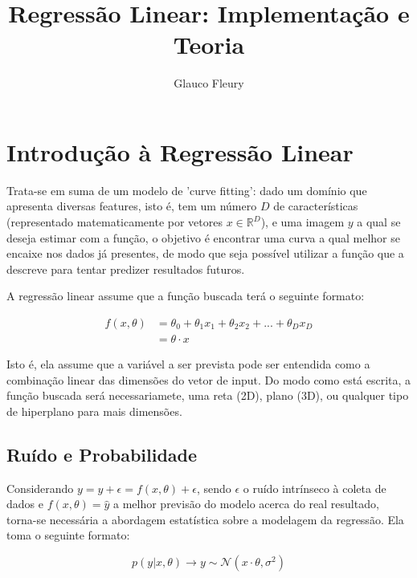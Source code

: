 \documentclass{article}
\title{Regressão Linear: Implementação e Teoria}
\author{
    Glauco Fleury
}
\date{}
\begin{document}
\maketitle

\section{Introdução à Regressão Linear}
 
Trata-se em suma de um modelo de 'curve fitting': dado
um domínio que apresenta diversas features, isto é,
tem um número $D$ de características (representado
matematicamente por vetores $x \in \mathbb{R}^{D} $), e
uma imagem $y$ a qual se deseja estimar com a função,
o objetivo é encontrar uma curva a qual melhor se encaixe
nos dados já presentes, de modo que seja possível utilizar
a função que a descreve para tentar predizer resultados 
futuros.

A regressão linear assume que a função buscada terá o
seguinte formato: 

\begin{equation}
    \begin{split}
        f(x, \theta) &=  \theta_{0} + \theta_{1}x_{1} + \theta_{2}x_{2}
        + ... + \theta_{D}x_{D} \\ 
        &= \theta \cdot x
    \end{split}
\end{equation}

Isto é, ela assume que a variável a ser prevista pode ser
entendida como a combinação linear das dimensões do vetor de 
input. Do modo como está escrita, a função buscada será 
necessariamete, uma reta (2D), plano (3D), ou qualquer tipo de
hiperplano para mais dimensões. 

\subsection{Ruído e Probabilidade}

Considerando $y = \hat{y} + \epsilon = f(x,\theta) + \epsilon$,
sendo $\epsilon$ o ruído intrínseco à coleta de dados e 
$f(x,\theta) = \hat{y}$ a melhor previsão do modelo acerca do
real resultado, torna-se necessária a abordagem estatística
sobre a modelagem da regressão. Ela toma o seguinte formato:

\begin{equation}
    p(y|x,\theta) \rightarrow y \sim \mathcal{N}(x \cdot \theta, \sigma^{2}) 
\end{equation}
\end{document}
